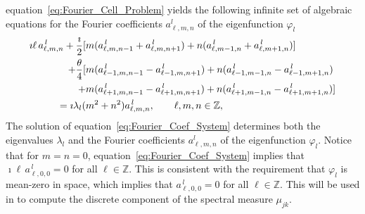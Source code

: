 \documentclass[amsa]{ipart}
\begin{document}
equation~\eqref{eq:Fourier_Cell_Problem} yields the following infinite
set of algebraic equations for the Fourier coefficients $a^l_{\ell,m,n}$
of the eigenfunction $\varphi_l$ 
%
\begin{align}\label{eq:Fourier_Coef_System}
\imath \ell\,a^{\,l}_{\ell,m,n}+\frac{\imath}{2}
[&m(a^{\,l}_{\ell,m,n-1}+a^{\,l}_{\ell,m,n+1})+n(a^{\,l}_{\ell,m-1,n}+a^{\,l}_{\ell,m+1,n})]
\\
+\frac{\theta}{4}[&m(a^{\,l}_{\ell-1,m,n-1}-a^{\,l}_{\ell-1,m,n+1})+n(a^{\,l}_{\ell-1,m-1,n}-a^{\,l}_{\ell-1,m+1,n})
\notag\\
+&m(a^{\,l}_{\ell+1,m,n-1}-a^{\,l}_{\ell+1,m,n+1})+n(a^{\,l}_{\ell+1,m-1,n}-a^{\,l}_{\ell+1,m+1,n})]
\notag\\
=\imath\lambda_l(&m^2+n^2)a^{\,l}_{\ell,m,n}, \qquad \ell,m,n\in\mathbb{Z},
\notag
\end{align}
%
The solution of equation~\eqref{eq:Fourier_Coef_System} determines
both the eigenvalues $\lambda_l$ and the Fourier coefficients $a^l_{\ell,m,n}$
of the eigenfunction $\varphi_l$. Notice that for $m=n=0$,
equation~\eqref{eq:Fourier_Coef_System} implies that
$\imath \ell\,a^{\,l}_{\ell,0,0}=0$ for all $\ell\in\mathbb{Z}$. This is consistent
with the requirement that $\varphi_l$ is mean-zero in space, which implies
that $a^{\,l}_{\ell,0,0}=0$ for all $\ell\in\mathbb{Z}$. This will be used in
 to compute the discrete component of the
spectral measure $\mu_{jk}$. 
\end{document}
